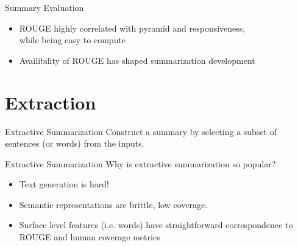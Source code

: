 \documentclass[xcolor={table}]{beamer}
\begin{document}
\begin{frame}{Summary Evaluation}

    \begin{itemize}
        \item \textcolor{green!70}{ROUGE highly correlated with pyramid and 
            responsiveness,\\
            while being easy to compute}
        \item Availibility of ROUGE has shaped summarization development

    \end{itemize}

\end{frame}


\section{Extraction}


\begin{frame}{Extractive Summarization}
    Construct a summary by selecting a subset of sentences (or words) from 
    the inputs.
\end{frame}

\begin{frame}{Extractive Summarization}
    Why is extractive summarization so popular?
    \begin{itemize}
        \item Text generation is hard!
        \item Semantic representations are brittle, low coverage. 
        \item Surface level features (i.e. words) have straightforward 
            correspondence to ROUGE and human coverage metrics
    \end{itemize}
\end{frame}



\end{document}
